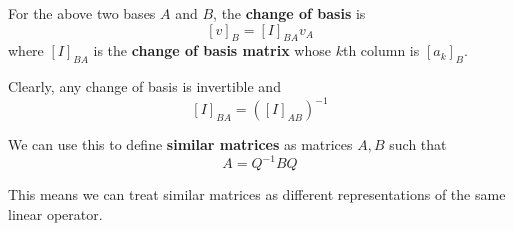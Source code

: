 \begin{definition}
For the above two bases $A$ and $B$, the \textbf{change of basis} is 
$$[v]_{B} = [I]_{BA} v_{A}$$
where $[I]_{BA}$ is the \textbf{change of basis matrix} whose $k$th column is $[a_{k}]_{B}$. 

Clearly, any change of basis is invertible and 
$$[I]_{BA} = ([I]_{AB})^{-1}$$
\end{definition}

\begin{definition}
We can use this to define \textbf{similar matrices} as matrices $A, B$ such that 
$$A = Q^{-1}BQ$$

This means we can treat similar matrices as different representations of the same linear operator. 
\end{definition}